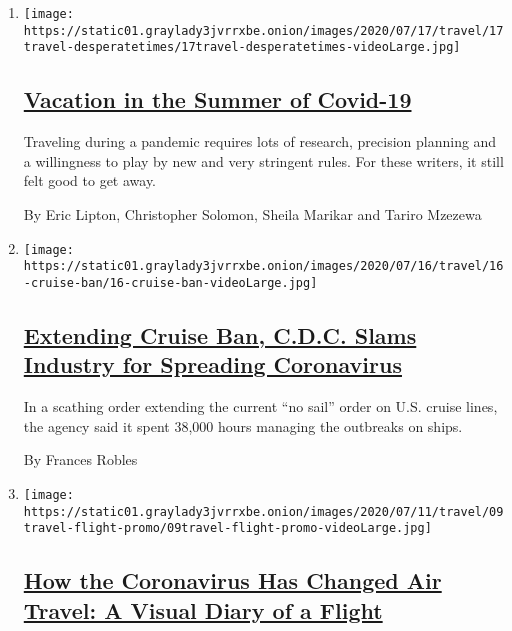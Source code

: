 \begin{enumerate}
\def\labelenumi{\arabic{enumi}.}
\item
  \texttt{[image: https://static01.graylady3jvrrxbe.onion/images/2020/07/17/travel/17travel-desperatetimes/17travel-desperatetimes-videoLarge.jpg]}

  \hypertarget{vacation-in-the-summer-of-covid-19}{%
  \subsection{\texorpdfstring{\href{/2020/07/16/travel/virus-vacation.html}{Vacation
  in the Summer of
  Covid-19}}{Vacation in the Summer of Covid-19}}\label{vacation-in-the-summer-of-covid-19}}

  Traveling during a pandemic requires lots of research, precision
  planning and a willingness to play by new and very stringent rules.
  For these writers, it still felt good to get away.

  By Eric Lipton, Christopher Solomon, Sheila Marikar and Tariro Mzezewa
\item
  \texttt{[image: https://static01.graylady3jvrrxbe.onion/images/2020/07/16/travel/16-cruise-ban/16-cruise-ban-videoLarge.jpg]}

  \hypertarget{extending-cruise-ban-cdc-slams-industry-for-spreading-coronavirus}{%
  \subsection{\texorpdfstring{\href{/2020/07/16/travel/coronavirus-cruise-ban-extended.html}{Extending
  Cruise Ban, C.D.C. Slams Industry for Spreading
  Coronavirus}}{Extending Cruise Ban, C.D.C. Slams Industry for Spreading Coronavirus}}\label{extending-cruise-ban-cdc-slams-industry-for-spreading-coronavirus}}

  In a scathing order extending the current ``no sail'' order on U.S.
  cruise lines, the agency said it spent 38,000 hours managing the
  outbreaks on ships.

  By Frances Robles
\item
  \texttt{[image: https://static01.graylady3jvrrxbe.onion/images/2020/07/11/travel/09travel-flight-promo/09travel-flight-promo-videoLarge.jpg]}

  \hypertarget{how-the-coronavirus-has-changed-air-travel-a-visual-diary-of-a-flight}{%
  \subsection{\texorpdfstring{\href{/interactive/2020/07/09/travel/coronavirus-air-travel-visual-diary.html}{How
  the Coronavirus Has Changed Air Travel: A Visual Diary of a
  Flight}}{How the Coronavirus Has Changed Air Travel: A Visual Diary of a Flight}}\label{how-the-coronavirus-has-changed-air-travel-a-visual-diary-of-a-flight}}


\end{enumerate}
